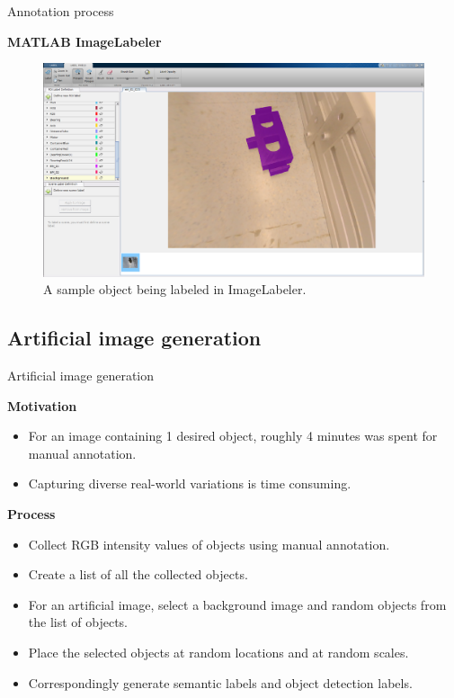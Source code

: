 \documentclass{beamer}
\begin{document}
\begin{frame}{Annotation process}
	
	\textbf{MATLAB ImageLabeler}
	\begin{figure}[!htb]
		\centering
		\includegraphics[width=.8\linewidth]{images/imglabler_eg}
		\captionsetup{justification=centering,margin=0.2cm}
		\caption{A sample object being labeled in ImageLabeler.}
		\label{Fig:annotate}
	\end{figure}

\end{frame}

\subsection{Artificial image generation}

\begin{frame}{Artificial image generation}

	\textbf{Motivation}
	\begin{small}
		\begin{itemize}
			\item For an image containing 1 desired object, roughly 4 minutes was spent for manual annotation.
			\item Capturing diverse real-world variations is time consuming.
		\end{itemize}
	\end{small}
		
	\vspace{5mm}
		
	\textbf{Process}
	\begin{small}
		\begin{itemize}
			\item Collect RGB intensity values of objects using manual annotation.
			\item Create a list of all the collected objects.
			\item For an artificial image, select a background image and random objects from the list of objects. 
			\item Place the selected objects at random locations and at random scales. 
			\item Correspondingly generate semantic labels and object detection labels.
		\end{itemize}
	\end{small}

\end{frame}
\end{document}
